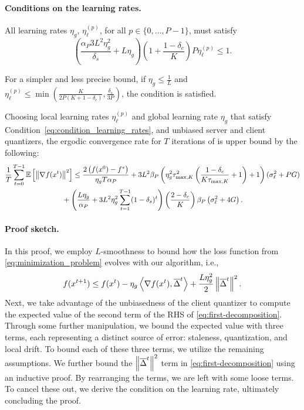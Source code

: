 \paragraph{Conditions on the learning rates.}
All learning rates $\eta_g$, $\eta^{(p)}_{\ell}$, for all $p \in \{0, \ldots, P-1\}$, must satisfy
\begin{equation}\label{eq:condition_learning_rates}
    \left(\frac{\alpha_P 3L^2 \eta_g^2}{\delta_s} + L \eta_g \right) \left(1 + \frac{1-\delta_c}{K}\right)P \eta^{(p)}_{\ell} \leq 1.
\end{equation}

For a simpler and less precise bound, if $\eta_g \leq \tfrac{1}{L}$ and $\eta_{\ell}^{(p)} \leq \min \left( \tfrac{K}{2P(K+1-\delta_c)}, \tfrac{\delta_s}{3P} \right)$, the condition is satisfied.

\begin{theorem}
    \label{thm:main-convergence}
    Choosing local learning rates $\eta_{\ell}^{(p)}$ and global learning rate $\eta_g$ that satisfy Condition~\eqref{eq:condition_learning_rates}, and unbiased server and client quantizers, the ergodic convergence rate for $T$ iterations of \algname{} is upper bound by the following:
    \begin{multline}
        \frac{1}{T} \sum_{t=0}^{T-1} \mathbb{E}\left[\left\lVert\nabla f(x^t)\right\rVert^2\right] \leq \frac{2\left(f(x^0) - f^* \right)}{\eta_g T \alpha_P} + 3 L^2 \beta_P \left( \eta^2_g \tau_{\max,K}^2 \left( \frac{1-\delta_c}{K \tau_{\max, K}} + 1 \right) + 1 \right)  (\sigma_{\ell}^2 + PG) \\
        {} +  \left(\frac{L \eta_g}{\alpha_P} + 3L^2 \eta_g^2 \sum_{t=1}^{T-1} (1-\delta_s)^t \right) \left(\frac{2-\delta_c}{K}\right)\beta_P \left(\sigma_{\ell}^2 + 4G\right).
    \end{multline}
\end{theorem}

\paragraph{Proof sketch.}
In this proof, we employ $L$-smoothness to bound how the loss function from \eqref{eq:minimization_problem} evolves with our algorithm, i.e.,
\begin{equation} \label{eq:first-decomposition}
    f(x^{t+1}) \leq f(x^t) - \eta_g \left\langle \nabla f(x^t), \overline{\Delta}^t \right\rangle +\frac{L\eta^2_g}{2} \left\lVert\overline{\Delta}^t\right\rVert^2.
\end{equation}
Next, we take advantage of the unbiasedness of the client quantizer to compute the expected value of the second term of the RHS of \eqref{eq:first-decomposition}.
Through some further manipulation, we bound the expected value with three terms, each representing a distinct source of error: staleness, quantization, and local drift.
To bound each of these three terms, we utilize the remaining assumptions.
We further bound the $\left\lVert\overline{\Delta}^t\right\rVert^2$ term in \eqref{eq:first-decomposition} using an inductive proof.
By rearranging the terms, we are left with some loose terms.
To cancel these out, we derive the condition on the learning rate, ultimately concluding the proof.

